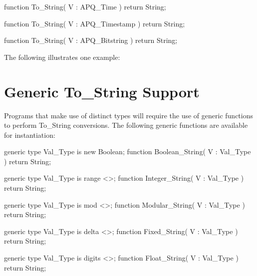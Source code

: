 \documentclass[english,letterpaper]{book}
\begin{document}
\begin{Code}
function To_String(
   V : APQ_Time
) return String;
\end{Code}

\begin{Code}
function To_String(
   V : APQ_Timestamp
) return String;
\end{Code}

\begin{Code}
function To_String(
   V : APQ_Bitstring
) return String;
\end{Code}

The following illustrates one example:

\begin{Example}
declare
   Ship_Date : APQ_Date;
begin
   Put({
   Put_Line(To_String(Ship_Date));
\end{Example}

\section{Generic To\_String Support}

Programs that make use of distinct types will require the use of generic
functions to perform To\_String conversions. The following generic
functions are available for instantiation:

\begin{Code}
generic
   type Val_Type is new Boolean;
function Boolean_String(
   V : Val_Type
) return String;
\end{Code}

\begin{Code}
generic
   type Val_Type is range <>;
function Integer_String(
   V : Val_Type
) return String;
\end{Code}

\begin{Code}
generic
   type Val_Type is mod <>;
function Modular_String(
   V : Val_Type
) return String;
\end{Code}

\begin{Code}
generic
   type Val_Type is delta <>;
function Fixed_String(
   V : Val_Type
) return String;
\end{Code}

\begin{Code}
generic
   type Val_Type is digits <>;
function Float_String(
   V : Val_Type
) return String;
\end{Code}
\end{document}

